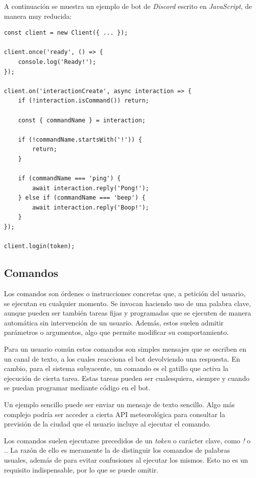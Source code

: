 A continuación se muestra un ejemplo de bot de \textit{Discord} escrito en \textit{JavaScript}, de manera muy reducida:

\begin{lstlisting}
const client = new Client({ ... });

client.once('ready', () => {
    console.log('Ready!');
});

client.on('interactionCreate', async interaction => {
    if (!interaction.isCommand()) return;

    const { commandName } = interaction;
    
    if (!commandName.startsWith('!')) {
    	return;
    }

    if (commandName === 'ping') {
        await interaction.reply('Pong!');
    } else if (commandName === 'beep') {
        await interaction.reply('Boop!');
    }
});

client.login(token);
\end{lstlisting}


\subsection{Comandos}

Los comandos son órdenes o instrucciones concretas que, a petición del usuario, se ejecutan en cualquier momento. Se invocan haciendo uso de una palabra clave, aunque pueden ser también tareas fijas y programadas que se ejecuten de manera automática sin intervención de un usuario. Además, estos suelen admitir parámetros o argumentos, algo que permite modificar su comportamiento.

Para un usuario común estos comandos son simples mensajes que se escriben en un canal de texto, a los cuales reacciona el bot devolviendo una respuesta. En cambio, para el sistema subyacente, un comando es el gatillo que activa la ejecución de cierta tarea. Estas tareas pueden ser cualesquiera, siempre y cuando se puedan programar mediante código en el bot.

Un ejemplo sencillo puede ser enviar un mensaje de texto sencillo. Algo más complejo podría ser acceder a cierta API meteorológica para consultar la previsión de la ciudad que el usuario incluye al ejecutar el comando.

Los comandos suelen ejecutarse precedidos de un \textit{token} o carácter clave, como \textit{!} o \textit{.}. La razón de ello es meramente la de distinguir los comandos de palabras usuales, además de para evitar confusiones al ejecutar los mismos. Esto no es un requisito indispensable, por lo que se puede omitir.

